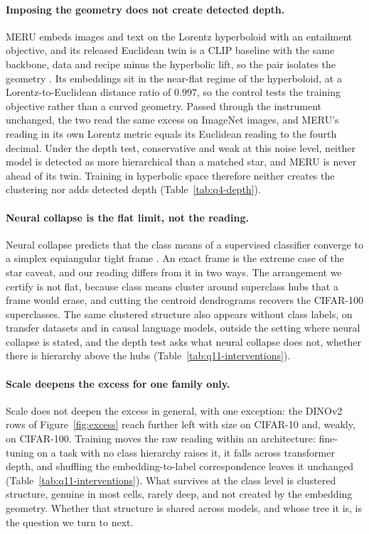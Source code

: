 \documentclass{article}
\begin{document}
\paragraph{Imposing the geometry does not create detected depth.} MERU embeds images and text on the Lorentz hyperboloid with an entailment objective, and its released Euclidean twin is a CLIP baseline with the same backbone, data and recipe minus the hyperbolic lift, so the pair isolates the geometry \citep{desai2023meru}. Its embeddings sit in the near-flat regime of the hyperboloid, at a Lorentz-to-Euclidean distance ratio of $0.997$, so the control tests the training objective rather than a curved geometry. Passed through the instrument unchanged, the two read the same excess on ImageNet images, and MERU's reading in its own Lorentz metric equals its Euclidean reading to the fourth decimal. Under the depth test, conservative and weak at this noise level, neither model is detected as more hierarchical than a matched star, and MERU is never ahead of its twin. Training in hyperbolic space therefore neither creates the clustering nor adds detected depth (Table~\ref{tab:q4-depth}). %

\paragraph{Neural collapse is the flat limit, not the reading.} Neural collapse predicts that the class means of a supervised classifier converge to a simplex equiangular tight frame \citep{papyan2020prevalence}. An exact frame is the extreme case of the star caveat, and our reading differs from it in two ways. The arrangement we certify is not flat, because class means cluster around superclass hubs that a frame would erase, and cutting the centroid dendrograms recovers the CIFAR-100 superclasses. The same clustered structure also appears without class labels, on transfer datasets and in causal language models, outside the setting where neural collapse is stated, and the depth test asks what neural collapse does not, whether there is hierarchy above the hubs (Table~\ref{tab:q11-interventions}). %

\paragraph{Scale deepens the excess for one family only.} Scale does not deepen the excess in general, with one exception: the DINOv2 rows of Figure~\ref{fig:excess} reach further left with size on CIFAR-10 and, weakly, on CIFAR-100. Training moves the raw reading within an architecture: fine-tuning on a task with no class hierarchy raises it, it falls across transformer depth, and shuffling the embedding-to-label correspondence leaves it unchanged (Table~\ref{tab:q11-interventions}). What survives at the class level is clustered structure, genuine in most cells, rarely deep, and not created by the embedding geometry. Whether that structure is shared across models, and whose tree it is, is the question we turn to next. %
\end{document}

